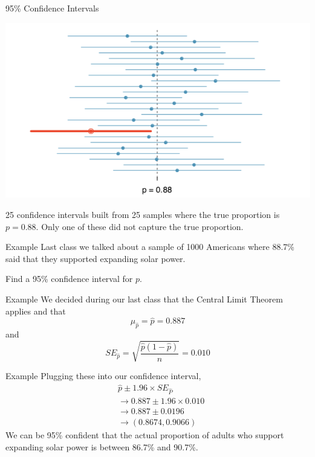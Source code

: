 \begin{frame}{95\% Confidence Intervals}
    \begin{center}
        \vspace{-20pt}\includegraphics[scale=0.4]{images/manyCIs.png}
    \end{center}
    \vspace{-8pt}\small{25 confidence intervals built from 25 samples where the true proportion is $p=0.88$}. Only one of these did not capture the true proportion.
\end{frame}

\begin{frame}{Example}
    Last class we talked about a sample of 1000 Americans where 88.7\% said that they supported expanding solar power.
    
    \vspace{12pt}Find a 95\% confidence interval for $p$.
\end{frame}

\begin{frame}{Example}
    We decided during our last class that the Central Limit Theorem applies and that
    \[
        \mu_{\hat{p}} = \hat{p} = 0.887
    \]
    and
    \[
        SE_{\hat{p}} = \sqrt{\frac{\hat{p}(1-\hat{p})}{n}} = 0.010
    \]
\end{frame}

\begin{frame}{Example}
    Plugging these into our confidence interval,
    \begin{align*}
        &\hat{p} \pm 1.96 \times SE_{\hat{P}} \\
        &\rightarrow 0.887 \pm 1.96 \times 0.010 \\
        &\rightarrow 0.887 \pm 0.0196 \\
        &\rightarrow (0.8674, 0.9066)
    \end{align*}
    We can be 95\% confident that the actual proportion of adults who support expanding solar power is between 86.7\% and 90.7\%.
\end{frame}

